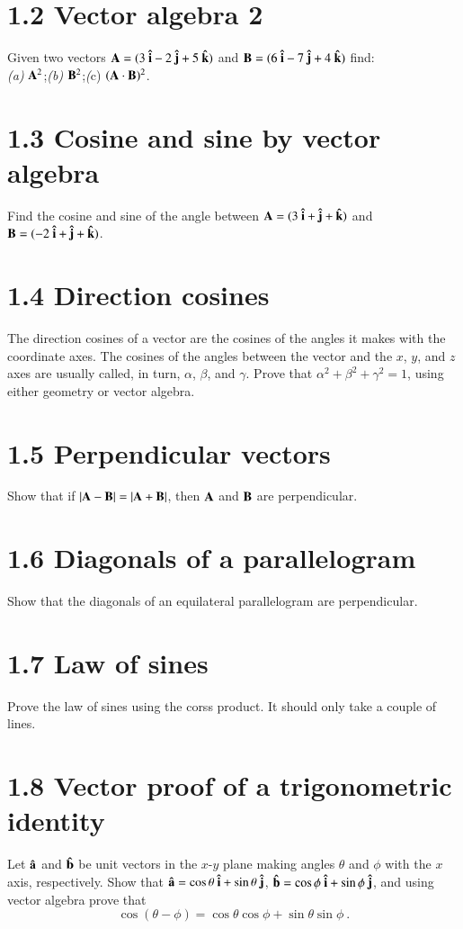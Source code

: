 \documentclass{article}
\newcommand{\vi}{\vb{\hat i}}
\newcommand{\vj}{\vb{\hat j}}
\newcommand{\vk}{\vb{\hat k}}
\begin{document}
\section*{1.2 Vector algebra 2}
Given two vectors $\vb A = (3\ \vi - 2\ \vj + 5\ \vk)$ and $\vb B = (6\ \vi - 7\ \vj + 4\ \vk)$ find:\\
\textit{(a)} $\vb A^2$;\quad \textit{(b)} $\vb B^2$;\quad \textit(c) $(\vb A \cdot \vb B)^2$.

\section*{1.3 Cosine and sine by vector algebra}
Find the cosine and sine of the angle between $\vb A = (3\ \vi + \vj + \vk)$ and $\vb B = (-2\ \vi + \vj + \vk)$.

\section*{1.4 Direction cosines}
The direction cosines of a vector are the cosines of the angles it
makes with the coordinate axes. The cosines of the angles between
the vector and the $x$, $y$, and $z$ axes are usually called, in turn, $\alpha$, $\beta$,
and $\gamma$. Prove that $\alpha^2 + \beta^2 + \gamma^2 = 1$, using either geometry or vector
algebra.

\section*{1.5 Perpendicular vectors}
Show that if $|\vb A - \vb B| = |\vb A + \vb B|$, then $\vb A$ and $\vb B$ are perpendicular.

\section*{1.6 Diagonals of a parallelogram}
Show that the diagonals of an equilateral parallelogram are
perpendicular.

\section*{1.7 Law of sines}
Prove the law of sines using the corss product. It should only take a couple of lines.

\section*{1.8 Vector proof of a trigonometric identity}
Let $\vb{\hat a}$ and $\vb{\hat b}$ be unit vectors in the $x$-$y$ plane making angles $\theta$ and $\phi$ with the $x$ axis, respectively. Show that $\vb{\hat a} = \cos \theta\ \vi + \sin \theta\ \vj$, $\vb{\hat b} = \cos \phi\ \vi + \sin \phi\ \vj$, and using vector algebra prove that
\[
	\cos(\theta-\phi) = \cos \theta \cos \phi + \sin \theta \sin \phi\ .
\] 
\end{document}
